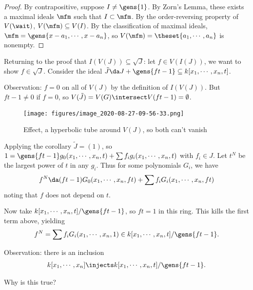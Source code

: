 \begin{proof}

By contrapositive, suppose \(I\neq \gens{1}\). By Zorn's Lemma, these
exists a maximal ideals \(\mfm\) such that \(I \subset \mfm\). By the
order-reversing property of \(V(\wait)\), \(V(\mfm) \subseteq V(I)\). By
the classification of maximal ideals,
\(\mfm = \gens{x-a_1, \cdots, x-a_n}\), so
\(V(\mfm) = \theset{a_1, \cdots, a_n}\) is nonempty.

\end{proof}

Returning to the proof that \(I(V(J)) \subseteq \sqrt{J}\): let
\(f\in V(I(J))\), we want to show \(f\in \sqrt{J}\). Consider the ideal
\(\tilde J \da J + \gens{ft - 1} \subseteq k[x_1, \cdots, x_n, t]\).

Observation: \(f = 0\) on all of \(V(J)\) by the definition of
\(I(V(J))\). But \(ft-1 \neq 0\) if \(f=0\), so
\(V(\tilde J) = V(G) \intersect V(ft-1) = \emptyset\).

\begin{figure}
\centering
\texttt{[image: figures/image\_2020-08-27-09-56-33.png]}
\caption{Effect, a hyperbolic tube around \(V(J)\), so both can't
vanish}
\end{figure}

Applying the corollary \(\tilde J = (1)\), so
\(1 = \gens{ft-1} g_0(x_1, \cdots, x_n, t) + \sum f_i g_i(x_1, \cdots, x_n, t)\)
with \(f_i \in J\). Let \(t^N\) be the largest power of \(t\) in any
\(g_i\). Thus for some polynomials \(G_i\), we have
\begin{align*}  
f^N \da (ft-1) G_0(x_1, \cdots, x_n, ft) + \sum f_i G_i(x_1, \cdots, x_n, ft)
\end{align*} noting that \(f\) does not depend on \(t\).

Now take \(k[x_1, \cdots, x_n, t]/\gens{ft-1}\), so \(ft=1\) in this
ring. This kills the first term above, yielding
\begin{align*}  
f^N = \sum f_i G_i(x_1, \cdots, x_n, 1) \in k[x_1, \cdots, x_n, t]/\gens{ft-1}
.\end{align*}

Observation: there is an inclusion
\begin{align*}  
k[x_1, \cdots, x_n] \injects
k[x_1, \cdots, x_n, t]/\gens{ft-1}
.\end{align*}

\begin{exercise}

Why is this true?

\end{exercise}


